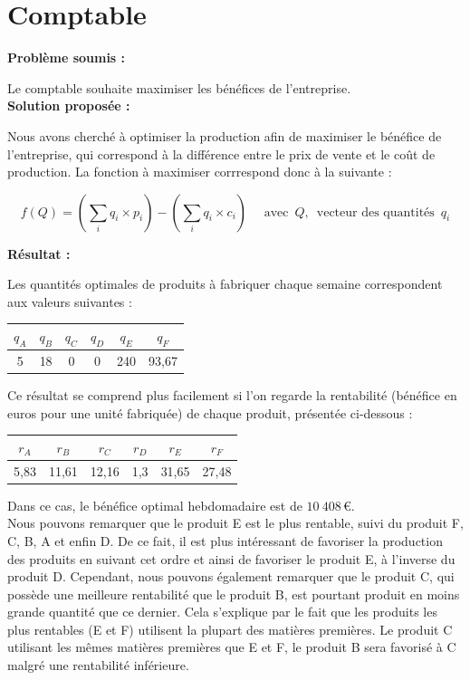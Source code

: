 \documentclass[paper=a4, fontsize=11pt]{report}
\numberwithin{equation}{section}		%
\numberwithin{figure}{section}			%
\numberwithin{table}{section}				%
\renewcommand{\bf}[1]{\textbf{#1}}
\begin{document}
\section{Comptable}
\bf{Problème soumis :}

Le comptable souhaite maximiser les bénéfices de l'entreprise.\\

\bf{Solution proposée :}

Nous avons cherché à optimiser la production afin de maximiser le bénéfice de l'entreprise, qui correspond à la différence entre le prix de vente et le coût de production. La fonction à maximiser corrrespond donc à la suivante :

\[f(Q) = (\sum_i q_i \times p_i ) - (\sum_i q_i \times c_i) \quad \text{  avec } \, Q, \, \text{ vecteur des quantités } \, q_i \]

\bf{Résultat :}

Les quantités optimales de produits à fabriquer chaque semaine correspondent aux valeurs suivantes :

\begin{center}
\begin{tabular}{cccccc}
\hline
$q_A$ & $q_B$ & $q_C$ & $q_D$ & $q_E$ & $q_F$ \\
\hline
5 & 18 & 0 & 0 & 240 & 93,67 \\
\hline
\end{tabular}
\end{center}

Ce résultat se comprend plus facilement si l'on regarde la rentabilité (bénéfice en euros pour une unité fabriquée) de chaque produit, présentée ci-dessous :

\begin{center}
\begin{tabular}{cccccc}
\hline
$r_A$ & $r_B$ & $r_C$ & $r_D$ & $r_E$ & $r_F$ \\
\hline
5,83 & 11,61 & 12,16 & 1,3 & 31,65 & 27,48 \\
\hline
\end{tabular}
\end{center}

Dans ce cas, le bénéfice optimal hebdomadaire est de $10\:408\,$€.\\

Nous pouvons remarquer que le produit E est le plus rentable, suivi du produit F, C, B, A et enfin D. De ce fait, il est plus intéressant de favoriser la production des produits en suivant cet ordre et ainsi de favoriser le produit E, à l'inverse du produit D. Cependant, nous pouvons également remarquer que le produit C, qui possède une meilleure rentabilité que le produit B, est pourtant produit en moins grande quantité que ce dernier. Cela s'explique par le fait que les produits les plus rentables (E et F) utilisent la plupart des matières premières. Le produit C utilisant les mêmes matières premières que E et F, le produit B sera favorisé à C malgré une rentabilité inférieure.
\end{document}
